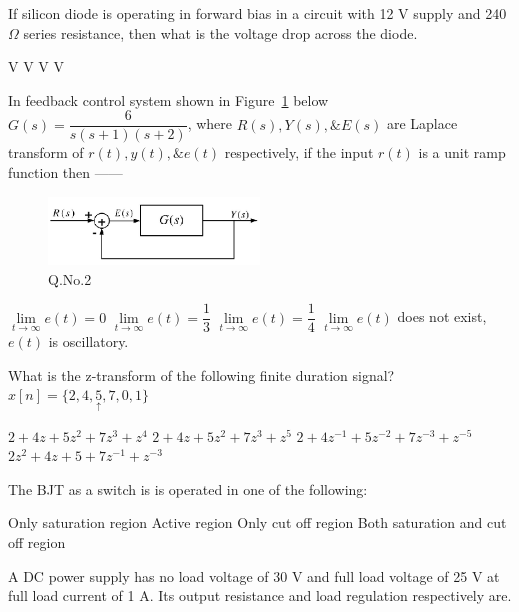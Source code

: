 \documentclass[a4, 12pt, addpoints]{exam}
\begin{document}
\begin{questions}
\question If silicon diode is operating in forward bias in a circuit with 12 V supply and 240 $\Omega$ series resistance, then what is the voltage drop across the diode. \\[0.3cm]
\begin{oneparchoices}
 V
 V
 V
 V
\end{oneparchoices}  
\question In feedback control system shown in Figure~\ref{q2} below $ G(s) = \dfrac{6}{s(s+1)(s+2)} $, where $R(s), Y(s), \& E(s)$ are Laplace transform of $r(t), y(t), \& e(t) $ respectively, if the input $r(t)$ is a unit ramp function then ------  \\[0.3cm]
\begin{figure}[h!]
\centering
\includegraphics[width=0.5\textwidth]{fbc.png}
\caption{Q.No.2}
\label{q2}
\end{figure}
\begin{oneparchoices}
\choice $\lim \limits_{t \to \infty } e(t) = 0$
\choice $\lim \limits_{t \to \infty } e(t) = \dfrac{1}{3}$
\choice $\lim \limits_{t \to \infty } e(t) = \dfrac{1}{4}$
\choice $\lim \limits_{t \to \infty } e(t) $ does not exist, $e(t)$ is oscillatory.
\end{oneparchoices}  
\question What is the z-transform of the following finite duration signal? $ x[n] = \{ 2, 4, \underset{\uparrow}{5}, 7, 0, 1 \} $\\[0.3cm]
\begin{oneparchoices}
\choice $ 2 + 4z + 5z^2 + 7z^3 + z^4  $
\choice $2 + 4z + 5z^2 + 7z^3 + z^5$
\choice $ 2 + 4z^{-1} + 5z^{-2} + 7z^{-3} + z^{-5} $
\choice $ 2z^2 + 4z + 5 +7z^{-1} + z^{-3}$
\end{oneparchoices}  
\question The BJT as a switch is is operated in one of the following:
\begin{oneparchoices}
\choice Only saturation region
\choice Active region
\choice Only cut off region
\choice Both saturation and cut off region
\end{oneparchoices}  
\question A DC power supply has no load voltage of 30 V and full load voltage of 25 V at full load current of 1 A. Its output resistance and load regulation respectively are. \\[0.3cm]

\end{questions}
\end{document}
